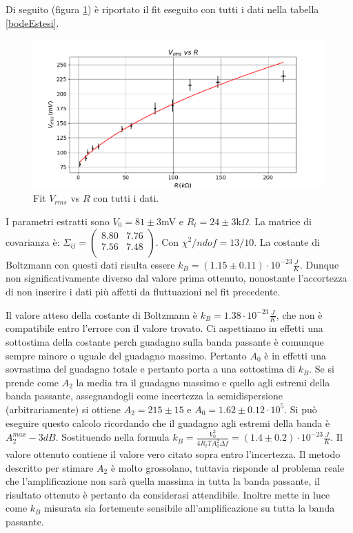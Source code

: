 \documentclass[10pt,a4paper]{article}
\begin{document}
Di seguito (figura \ref{boltzEstesi}) è riportato il fit eseguito con tutti i dati nella tabella \ref{bodeEstesi}.

\begin{figure}[!htb]
\centering
\includegraphics[scale=0.7]{boltzmannEstesoFit.png}
\caption{Fit $V_{rms}$ vs $R$ con tutti i dati.\label{boltzEstesi}}
\end{figure}

I parametri estratti sono $V_0 = 81 \pm 3$mV e $R_t = 24 \pm 3 \mbox{k}\Omega$. La matrice di covarianza è:  $\Sigma_{ij} = \left( \begin{array}{cc}
8.80 & 7.76\\ 
7.56 & 7.48\\
\end{array} \right)$. Con $\chi^2/ndof = 13/10$. La costante di Boltzmann con questi dati risulta essere $k_B = (1.15 \pm 0.11) \cdot 10^{-23} \frac{J}{K}$. Dunque non significativamente diverso dal valore prima ottenuto, nonostante l'accortezza di non inserire i dati più affetti da fluttuazioni nel fit precedente.


Il valore atteso della costante di Boltzmann è $k_{B} = 1.38 \cdot 10^{-23} \frac{J}{K}$, che non è compatibile entro l'errore con il valore trovato. Ci aspettiamo in effetti una sottostima della costante perch guadagno sulla banda passante è comunque sempre minore o uguale del guadagno massimo. Pertanto $A_0$ è in effetti una sovrastima del guadagno totale e pertanto porta a una sottostima di $k_B$. 
Se si prende come $A_2$ la media tra il guadagno massimo e quello agli estremi della banda passante, assegnandogli come incertezza la semidispersione (arbitrariamente) si ottiene $A_2 = 215 \pm 15$ e $A_0 =1.62 \pm 0.12 \cdot 10^{5}$. Si può eseguire questo calcolo ricordando che il guadagno agli estremi della banda è $A_2^{max} - 3 dB$. Sostituendo nella formula $k_B = \frac{V_0^2}{4 R_t T A_0^2 \Delta f}=(1.4 \pm 0.2) \cdot 10^{-23} \frac{J}{K}$. Il valore ottenuto contiene il valore vero citato sopra entro l'incertezza.
Il metodo descritto per stimare $A_2$ è molto grossolano, tuttavia risponde al problema reale che l'amplificazione non sarà quella massima in tutta la banda passante, il risultato ottenuto è pertanto da considerasi attendibile. Inoltre mette in luce come $k_B$ misurata sia fortemente sensibile all'amplificazione su tutta la banda passante. 
\end{document}
